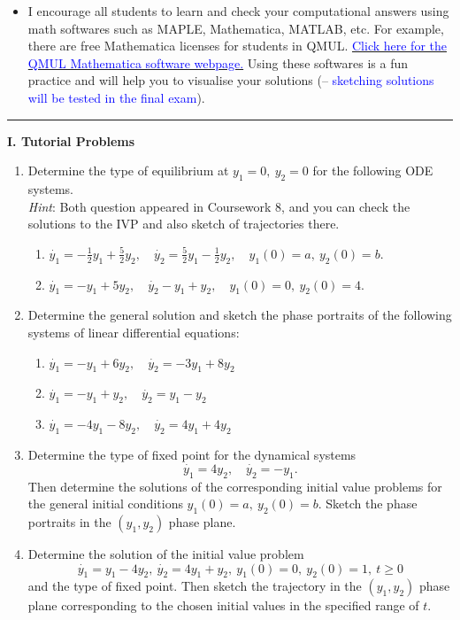 \documentclass[11pt,a4paper,twoside]{article}
\begin{document}
\begin{itemize}
		\item I encourage all students to learn and check your computational answers using math softwares such as MAPLE, Mathematica, MATLAB, etc. For example, there are free Mathematica licenses for students in QMUL. \href{https://www.its.qmul.ac.uk/services/service-catalogue/items/software---computational-mathematica.html}{\textcolor{blue}{Click here for the QMUL Mathematica software webpage.}} Using these softwares is a fun practice and will help you to visualise your solutions (– \textcolor{blue}{sketching solutions will be tested in the final exam}).
	\end{itemize}
	\rule{\textwidth}{0.4pt}
	\textbf{I. Tutorial Problems}\par
	\begin{enumerate}[\bfseries A.]
		\item Determine the type of equilibrium at $y_1 = 0,\ y_2 = 0$ for the following ODE systems.\\
		\textit{Hint}: Both question appeared in Coursework 8, and you can check the solutions to the IVP and also sketch of trajectories there.
		\begin{enumerate}[\bfseries 1)]
			\item $\dot{y_1} = -\frac{1}{2}y_1 + \frac{5}{2}y_2,\quad \dot{y_2} = \frac{5}{2}y_1 - \frac{1}{2}y_2,\quad y_1(0) = a,\ y_2(0) = b$.
			\item $\dot{y_1} = -y_1 + 5y_2,\quad \dot{y_2} - y_1 + y_2,\quad y_1(0) = 0,\ y_2(0) = 4.$
		\end{enumerate}
		\item Determine the general solution and sketch the phase portraits of the following systems of linear differential equations:
		\begin{enumerate}[\bfseries 1)]
			\item $\dot{y_1} = - y_1 + 6y_2 ,\quad \dot{y_2} = - 3y_1 + 8y_2$
			\item $\dot{y_1} = - y_1 + y_2,\quad \dot{y_2} = y_1 - y_2$
			\item $\dot{y_1} = - 4y_1 - 8y_2,\quad \dot{y_2} = 4y_1 + 4y_2$
		\end{enumerate}
		\item Determine the type of fixed point for the dynamical systems
		$$
		\dot{y_1} = 4y_2,\quad \dot{y_2} = - y_1.
		$$
		Then determine the solutions of the corresponding initial value problems for the general initial conditions $y_1(0) = a,\ y_2(0) = b$. Sketch the phase portraits in the $(y_1, y_2)$ phase plane.
		\item Determine the solution of the initial value problem
		$$
		\dot{y_1} = y_1 - 4y_2,\ \dot{y_2} = 4y_1 + y_2 ,\ y_1(0) = 0,\ y_2(0) = 1,\ t \geq 0
		$$
		and the type of fixed point. Then sketch the trajectory in the $(y_1, y_2)$ phase plane corresponding to the chosen initial values in the specified range of $t$.
	\end{enumerate}
\end{document}
